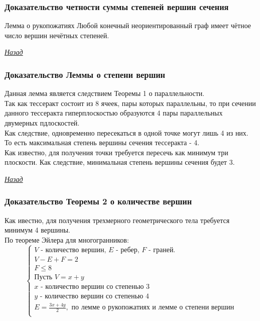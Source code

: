 \documentclass[10pt,pdf,hyperref={unicode}]{beamer}
\begin{document}
\begin{frame}
	\frametitle{Доказательство четности суммы степеней вершин сечения}
	\hypertarget{evenodd}{}
	\begin{block}{Лемма о рукопожатиях}
		Любой конечный неориентированный граф имеет чётное число вершин нечётных степеней.
	\end{block}

	{\raggedleft\vfill\itshape\Longstack[l]
	\hyperlink{evenodd_back}{Назад} \\
	}\par
\end{frame}
\begin{frame}
	\frametitle{Доказательство Леммы о степени вершин}
	\hypertarget{stepen}{}
	Данная лемма является следствием Теоремы 1 о параллельности. \\
	Так как тессеракт состоит из 8 ячеек, пары которых параллельны, то при сечении данного тессеракта гиперплоскостью образуются 4 пары параллельных двумерных пдлоскостей. \\
	Как следствие, одновременно пересекаться в одной точке могут лишь 4 из них. То есть максимальная степень вершины сечения тессеракта - 4. \\
	Как известно, для получения точки требуется пересечь как минимум три плоскости. Как следствие, минимальная степень вершины сечения будет 3.

	{\raggedleft\vfill\itshape\Longstack[l]
	\hyperlink{stepen_back}{Назад} \\
	}\par
\end{frame}
\begin{frame}
	\frametitle{Доказательство Теоремы 2 о количестве вершин}
	\hypertarget{theorem2}{}
	Как ивестно, для получения трехмерного геометрического тела требуется минимум 4 вершины. \\
	По теореме Эйлера для многогранников: 
	\begin{equation*}
	\left\{
		\begin{array}{lc}
		\mbox{$V$ - количество вершин, $E$ - ребер, $F$ - граней.} \\
		V-E+F=2 \\
		F\le8 \\
		\mbox{Пусть }V=x+y \\
		\mbox{$x$ - количество вершин со степенью 3}\\ 
		\mbox{$y$ - количество вершин со степенью 4} \\
		E=\frac{3x+4y}{2}, 
		\mbox{ по лемме о рукопожатиях и лемме о степени вершин}\\
	\end{array}
\end{equation*}
\end{frame}
\end{document}

